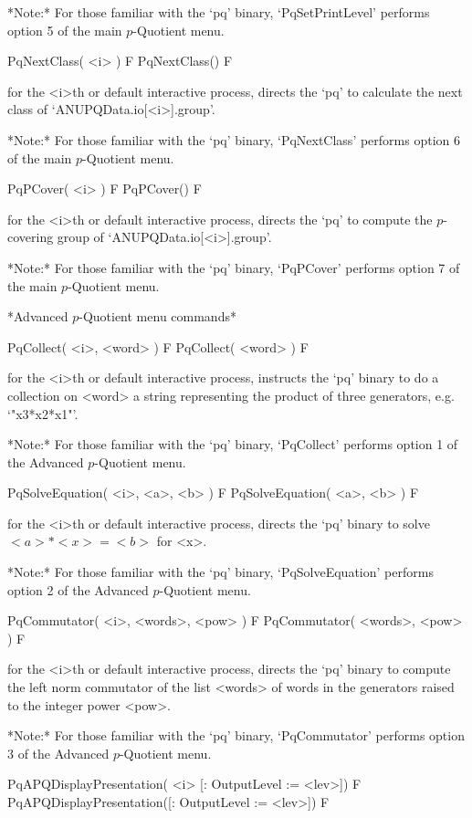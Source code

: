 *Note:* For  those  familiar  with  the  `pq'  binary,  `PqSetPrintLevel'
performs option 5 of the main $p$-Quotient menu.

\>PqNextClass( <i> ) F
\>PqNextClass() F

for the <i>th or default interactive {\ANUPQ} process, directs  the  `pq'
to calculate the next class of `ANUPQData.io[<i>].group'. 

*Note:* For those familiar with the `pq' binary,  `PqNextClass'  performs
option 6 of the main $p$-Quotient menu.

\>PqPCover( <i> ) F
\>PqPCover() F

for the <i>th or default interactive {\ANUPQ} process, directs  the  `pq'
to compute the $p$-covering group of `ANUPQData.io[<i>].group'.

*Note:* For those familiar with  the  `pq'  binary,  `PqPCover'  performs
option 7 of the main $p$-Quotient menu.

*Advanced $p$-Quotient menu commands*

\>PqCollect( <i>, <word> ) F
\>PqCollect( <word> ) F

for the <i>th or default interactive {\ANUPQ} process, instructs the `pq'
binary to do a collection on <word> a string representing the product  of
three generators, e.g. `"x3*x2*x1"'.

*Note:* For those familiar with the  `pq'  binary,  `PqCollect'  performs
option 1 of the Advanced $p$-Quotient menu.

\>PqSolveEquation( <i>, <a>, <b> ) F
\>PqSolveEquation( <a>, <b> ) F

for the <i>th or default interactive {\ANUPQ} process, directs  the  `pq'
binary to solve $<a> * <x> = <b>$ for <x>. 

*Note:* 
For those familiar  with  the  `pq'  binary,  `PqSolveEquation'  performs
option 2 of the Advanced $p$-Quotient menu.

\>PqCommutator( <i>, <words>, <pow> ) F
\>PqCommutator( <words>, <pow> ) F

for the <i>th or default interactive {\ANUPQ} process, directs  the  `pq'
binary to compute the left norm commutator of the list <words>  of  words
in the generators raised to the integer power <pow>.

*Note:*
For those familiar with the `pq' binary, `PqCommutator' performs option 3
of the Advanced $p$-Quotient menu.

\>PqAPQDisplayPresentation( <i> [: OutputLevel := <lev>]) F
\>PqAPQDisplayPresentation([: OutputLevel := <lev>]) F

